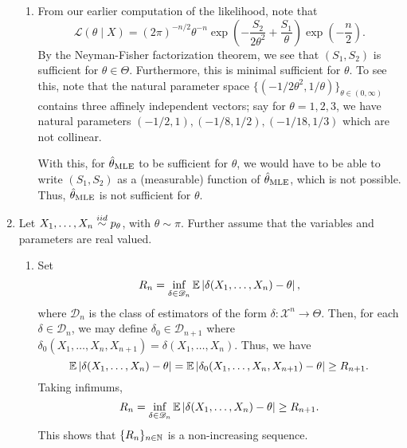 \documentclass[11pt]{article}
\begin{document}
\begin{enumerate}
\begin{enumerate}
            \item From our earlier computation of the likelihood, note that \[
                \mathcal{L}(\theta\mid X)
                    = (2\pi)^{-n / 2} \theta^{-n} \exp\left(-\frac{S_2}{2\theta^2} + \frac{S_1}{\theta}\right) \exp\left(-\frac{n}{2}\right).
            \] By the Neyman-Fisher factorization theorem, we see that $(S_1,
            S_2)$ is sufficient for $\theta \in \Theta$.
            Furthermore, this is minimal sufficient for $\theta$.
            To see this, note that the natural parameter space $\{(-1 /
            2\theta^2, 1 / \theta)\}_{\theta \in (0, \infty)}$ contains three
            affinely independent vectors; say for $\theta = 1, 2, 3$, we have
            natural parameters $(-1 / 2, 1), (-1 / 8, 1 / 2), (-1 / 18, 1 /
            3)$ which are not collinear.

            With this, for $\hat{\theta}_{\text{MLE}}$ to be sufficient for $\theta$,
            we would have to be able to write $(S_1, S_2)$ as a (measurable)
            function of $\hat{\theta}_{\text{MLE}}$, which is not possible.
            Thus, $\hat{\theta}_{\text{MLE}}$ is not sufficient for $\theta$.


        \end{enumerate}



        \item Let $X_1, \dots, X_n \overset{iid}{\sim} p_\theta$, with $\theta \sim \pi$.
        Further assume that the variables and parameters are real valued.
        \begin{enumerate}
            \item Set \[
                R_n
                    = \inf_{\delta \in \mathscr{D}_n} \mathbb{E} \left|\delta(X_1, \dots, X_n) - \theta\right|,
            \] where $\mathscr{D}_n$ is the class of estimators of the form
            $\delta\colon \mathscr{X}^n \to \Theta$.
            Then, for each $\delta \in \mathscr{D}_n$, we may define $\delta_0
            \in \mathscr{D}_{n + 1}$ where $\delta_0(X_1, \dots, X_n, X_{n +
            1}) = \delta(X_1, \dots, X_n)$.
            Thus, we have \[
                \mathbb{E} \left|\delta(X_1, \dots, X_n) - \theta\right|
                    = \mathbb{E} \left|\delta_0(X_1, \dots, X_n, X_{n + 1}) - \theta\right|
                    \geq R_{n + 1}.
            \] Taking infimums, \[
                R_n
                    = \inf_{\delta \in \mathscr{D}_n} \mathbb{E} \left|\delta(X_1, \dots, X_n) - \theta\right|
                    \geq R_{n + 1}.
            \] This shows that $\{R_n\}_{n \in \mathbb{N}}$ is a non-increasing sequence.



\end{enumerate}
\end{enumerate}
\end{document}
